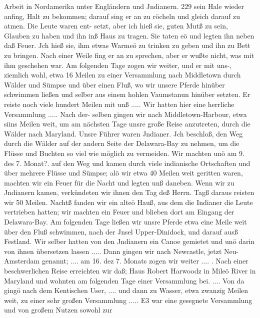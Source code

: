 Arbeit in Nordamerika unter Engländern und Jndianern. 229
sein Hale wieder anfing, Halt zu bekommen; darauf sing er an
zu röcheln und gleich darauf zu atmen. Die Leute waren ent-
setzt, aber ich hieß sie, guten Mutß zu sein, Glauben zu haben
und ihn inß Haus zu tragen. Sie taten eö und legten ihn neben
daß Feuer. Jch hieß sie, ihm etwas Warmeö zu trinken zu geben
und ihn zu Bett zu bringen. Nach einer Weile fing er an zu sprechen,
aber er wußte nicht, was mit ihm geschehen war. Am folgenden
Tage zogen wir weiter, und er mit uns-, ziemlich wohl, etwa
16 Meilen zu einer Versammlung nach Middletown durch Wälder
und Sümpse und über einen Fluß, wo wir unsere Pferde hinüber
schwimmen ließen und selber aus einem hohlen Vaumstanun hinüber
setzten. Er reiste noch viele hundert Meilen mit unß .....
Wir hatten hier eine herrliche Versammlung ..... Nach der-
selben gingen wir nach Middletown-Harbour, etwa siins Meilen weit,
um am nächsten Tage unsre große Reise anzutreten, durch die
Wälder nach Maryland. Unsre Führer waren Jndianer. Jch
beschloß, den Weg durch die Wälder auf der andern Seite der
Delawara-Bay zu nehmen, um die Flüsse und Buchten so viel wie
möglich zu vermeiden. Wir machten unö am 9. des 7. Monat?.
auf den Weg und kamen durch viele indianische Ortschaften und über
mehrere Flüsse und Sümpse; alö wir etwa 40 Meilen weit
geritten waren, machten wir ein Feuer für die Nacht und legten
unß daneben. Wenn wir zu Jndianern kamen, verkündeten
wir ihnen den Tag deß Herrn. Tagß daraus reisten wir 50 Meilen.
Nachtß fanden wir ein alteö Hauß, aus dem die Indianer die
Leute vertrieben hatten; wir machten ein Feuer und blieben dort
am Eingang der Delawara-Bay. Am folgenden Tage ließen wir
unsre Pferde etwa eine Meile weit über den Fluß schwimmen,
nach der Jnsel Upper-Dinidock, und darauf ausß Festland. Wir
selber hatten von den Jndianern ein Canoe gemietet und unö
darin von ihnen übersetzen lassen .....
Dann gingen wir nach Newcastle, jetzt Neu-Amsterdam
genannt; .... am 16. dez 7. Monats zogen wir weiter .... .
Nach einer beschwerlichen Reise erreichten wir daß; Haus Robert
Harwoodz in Mileö River in Maryland und wohnten am
folgenden Tage einer Versammlung bei. .... Von da gingö
nach dem Kentischen User, .... und dann zu Wasser, etwa zwanzig
Meilen weit, zu einer sehr großen Versammlung ..... E3 war
eine gesegnete Versammlung und von großem Nutzen sowohl zur

